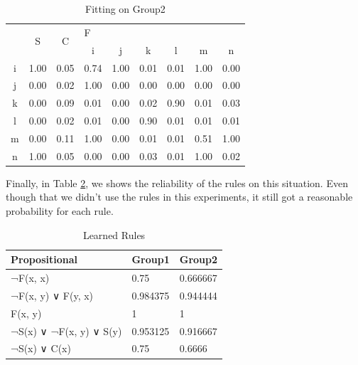 \begin{table}[]
\centering
\begin{tabular}{c|c|c|cccccc}
\toprule
\multirow{2}{*}{} & \multirow{2}{*}{S} & \multirow{2}{*}{C} & \multicolumn{6}{l}{F}                   \\ \cmidrule{4-9}
                  &                    &                    & i    & j    & k    & l    & m    & n    \\ \midrule
i                 & 1.00               & 0.05               & 0.74 & 1.00 & 0.01 & 0.01 & 1.00 & 0.00 \\
j                 & 0.00               & 0.02               & 1.00 & 0.00 & 0.00 & 0.00 & 0.00 & 0.00 \\
k                 & 0.00               & 0.09               & 0.01 & 0.00 & 0.02 & 0.90 & 0.01 & 0.03 \\
l                 & 0.00               & 0.02               & 0.01 & 0.00 & 0.90 & 0.01 & 0.01 & 0.01 \\
m                 & 0.00               & 0.11               & 1.00 & 0.00 & 0.01 & 0.01 & 0.51 & 1.00 \\
n                 & 1.00               & 0.05               & 0.00 & 0.00 & 0.03 & 0.01 & 1.00 & 0.02 \\ \bottomrule
\end{tabular}
\caption{Fitting on Group2}
\label{table:fitting-group-2}
\end{table}

Finally, in Table \ref{table:fitting-learned-rules}, we shows the reliability of the rules on this situation. Even though that we didn't use the rules in this experiments, it still got a reasonable probability for each rule.

\begin{table}[]
\centering
\begin{tabular}{lll}
\toprule
Propositional           & Group1   & Group2   \\ \midrule
¬F(x, x)                & 0.75     & 0.666667 \\
¬F(x, y) ∨ F(y, x)      & 0.984375 & 0.944444 \\
F(x, y)                 & 1        & 1        \\
¬S(x) ∨ ¬F(x, y) ∨ S(y) & 0.953125 & 0.916667 \\
¬S(x) ∨ C(x)            & 0.75     & 0.6666   \\ \bottomrule
\end{tabular}
\caption{Learned Rules}
\label{table:fitting-learned-rules}
\end{table}
